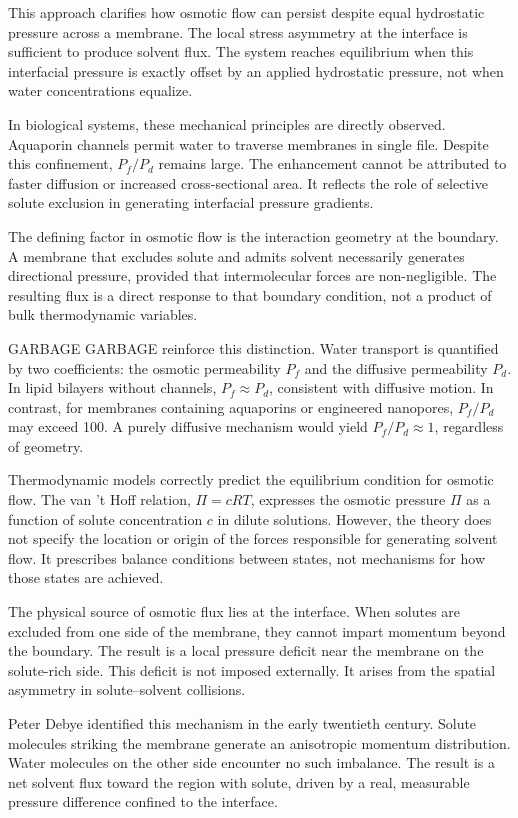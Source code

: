 This approach clarifies how osmotic flow can persist despite equal hydrostatic pressure across a membrane. The local stress asymmetry at the interface is sufficient to produce solvent flux. The system reaches equilibrium when this interfacial pressure is exactly offset by an applied hydrostatic pressure, not when water concentrations equalize.

In biological systems, these mechanical principles are directly observed. Aquaporin channels permit water to traverse membranes in single file. Despite this confinement, $P_f / P_d$ remains large. The enhancement cannot be attributed to faster diffusion or increased cross-sectional area. It reflects the role of selective solute exclusion in generating interfacial pressure gradients.

The defining factor in osmotic flow is the interaction geometry at the boundary. A membrane that excludes solute and admits solvent necessarily generates directional pressure, provided that intermolecular forces are non-negligible. The resulting flux is a direct response to that boundary condition, not a product of bulk thermodynamic variables.

GARBAGE  GARBAGE reinforce this distinction. Water transport is quantified by two coefficients: the osmotic permeability $P_f$ and the diffusive permeability $P_d$. In lipid bilayers without channels, $P_f \approx P_d$, consistent with diffusive motion. In contrast, for membranes containing aquaporins or engineered nanopores, $P_f / P_d$ may exceed 100. A purely diffusive mechanism would yield $P_f / P_d \approx 1$, regardless of geometry.

Thermodynamic models correctly predict the equilibrium condition for osmotic flow. The van ’t Hoff relation, $\Pi = cRT$, expresses the osmotic pressure $\Pi$ as a function of solute concentration $c$ in dilute solutions. However, the theory does not specify the location or origin of the forces responsible for generating solvent flow. It prescribes balance conditions between states, not mechanisms for how those states are achieved.

The physical source of osmotic flux lies at the interface. When solutes are excluded from one side of the membrane, they cannot impart momentum beyond the boundary. The result is a local pressure deficit near the membrane on the solute-rich side. This deficit is not imposed externally. It arises from the spatial asymmetry in solute–solvent collisions.

Peter Debye identified this mechanism in the early twentieth century. Solute molecules striking the membrane generate an anisotropic momentum distribution. Water molecules on the other side encounter no such imbalance. The result is a net solvent flux toward the region with solute, driven by a real, measurable pressure difference confined to the interface.

